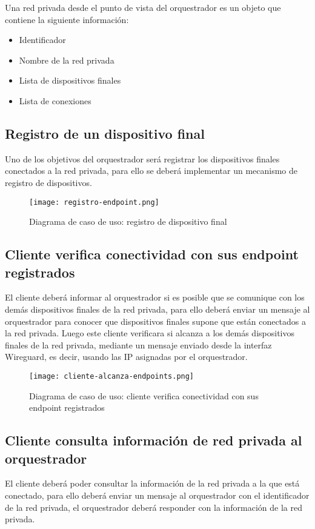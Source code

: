 Una red privada desde el punto de vista del orquestrador es un objeto que contiene la siguiente información:
\begin{itemize}
    \item Identificador
    \item Nombre de la red privada
    \item Lista de dispositivos finales
    \item Lista de conexiones
\end{itemize}

\subsection{Registro de un dispositivo final}
Uno de los objetivos del orquestrador será registrar los dispositivos finales conectados a la red privada, para ello se deberá implementar un mecanismo de registro de dispositivos.

\begin{figure}[h!]
    \centering
    \texttt{[image: registro-endpoint.png]}
    \caption{Diagrama de caso de uso: registro de dispositivo final}
\end{figure}


\subsection{Cliente verifica conectividad con sus endpoint registrados}
El cliente deberá informar al orquestrador si es posible que se comunique con los demás dispositivos finales de la red privada, para ello deberá enviar un mensaje al orquestrador para conocer que dispositivos finales supone que están conectados a la red privada.
Luego este cliente verificara si alcanza a los demás dispositivos finales de la red privada, mediante un mensaje enviado desde la interfaz Wireguard, es decir, usando las IP asignadas por el orquestrador.

\begin{figure}[h!]
    \centering
    \texttt{[image: cliente-alcanza-endpoints.png]}
    \caption{Diagrama de caso de uso: cliente verifica conectividad con sus endpoint registrados}
\end{figure}

\subsection{Cliente consulta información de red privada al orquestrador}
El cliente deberá poder consultar la información de la red privada a la que está conectado, para ello deberá enviar un mensaje al orquestrador con el identificador de la red privada, el orquestrador deberá responder con la información de la red privada.

